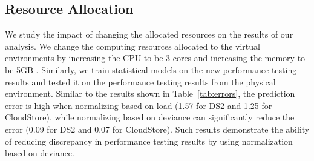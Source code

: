 \begin{comment}
\begin{table}[tbh]
	\centering
	\caption{Discrepancy vs. Change in Virtual Environment}
	\label{my-label}
	\resizebox{\columnwidth}{!}{%
		\begin{tabular}{|c||c|c|}
			\hline
			\multirow{2}{*}{\textbf{Type}} & \multicolumn{2}{c|}{\textbf{MAPE}} \\ \cline{2-3} 
			& \textbf{CloudStore} & \textbf{DS2} \\ %
			\midrule
			\midrule
			Internal validation & 3.65\% & 10.52\% \\ \hline
			External validation with virtual repeated test \# 1 & 6.04\% & 11.69\% \\ \hline
			External validation with virtual repeated test \# 2 & 5.43\% & 15.48\% \\ \hline
			VMWare & 10.18\% & 12.89\% \\ \hline
			Change in resources & 25.81\% & 84.36\% \\ \hline
		\end{tabular}%
	}
\end{table}
\end{comment}


\subsection{Resource Allocation}

We study the impact of changing the allocated resources on the results of our analysis. We change the computing resources allocated to the virtual environments by increasing the CPU to be 3 cores and increasing the memory to be 5GB . Similarly, we train statistical models on the new performance testing results and tested it on the performance testing results from the physical environment. Similar to the results shown in Table~\ref{tab:errors}, the prediction error is high when normalizing based on load (1.57 for DS2 and 1.25 for CloudStore), while normalizing based on deviance can significantly reduce the error (0.09 for DS2 and 0.07 for CloudStore). Such results demonstrate the ability of reducing discrepancy in performance testing results by using normalization based on deviance. 

